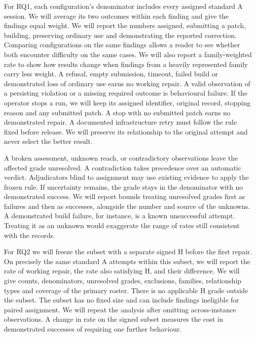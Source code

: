 For RQ1, each configuration's denominator includes every assigned standard A session. We will average its two outcomes within each finding and give the findings equal weight. We will report the numbers assigned, submitting a patch, building, preserving ordinary use and demonstrating the reported correction. Comparing configurations on the same findings allows a reader to see whether both encounter difficulty on the same cases. We will also report a family-weighted rate to show how results change when findings from a heavily represented family carry less weight. A refusal, empty submission, timeout, failed build or demonstrated loss of ordinary use earns no working repair. A valid observation of a persisting violation or a missing required outcome is behavioural failure. If the operator stops a run, we will keep its assigned identifier, original record, stopping reason and any submitted patch. A stop with no submitted patch earns no demonstrated repair. A documented infrastructure retry must follow the rule fixed before release. We will preserve its relationship to the original attempt and never select the better result.

A broken assessment, unknown reach, or contradictory observations leave the affected grade unresolved. A contradiction takes precedence over an automatic verdict. Adjudicators blind to assignment may use existing evidence to apply the frozen rule. If uncertainty remains, the grade stays in the denominator with no demonstrated success. We will report bounds treating unresolved grades first as failures and then as successes, alongside the number and source of the unknowns. A demonstrated build failure, for instance, is a known unsuccessful attempt. Treating it as an unknown would exaggerate the range of rates still consistent with the records.

For RQ2 we will freeze the subset with a separate signed H before the first repair. On precisely the same standard A attempts within this subset, we will report the rate of working repair, the rate also satisfying H, and their difference. We will give counts, denominators, unresolved grades, exclusions, families, relationship types and coverage of the primary roster. There is no applicable H grade outside the subset. The subset has no fixed size and can include findings ineligible for paired assignment. We will repeat the analysis after omitting across-instance observations. A change in rate on the signed subset measures the cost in demonstrated successes of requiring one further behaviour.

